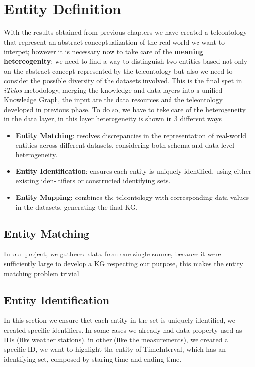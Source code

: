 \section{Entity Definition}

With the results obtained from previous chapters we have created a teleontology that represent an abstract conceptualization of the real world we want to interpet; however it is necessary now to take care of the \textbf{meaning hetereogenity}: we need to find a way to distinguish two entities based not only on the abstract conecpt represented by the teleontology but also we need to consider the possible diversity of the datasets involved. This is the final spet in \textit{iTelos} metodology, merging the knowledge and data layers into a unified Knowledge Graph,
the input are the data resources and the teleontology developed in previous phase.
To do so, we have to teke care of the heterogeneity in the data layer, in this layer heterogeneity is shown in 3 different
ways
\begin{itemize}
    \item \textbf{Entity Matching}: resolves discrepancies in the representation of real-world entities across
different datasets, considering both schema and data-level heterogeneity.
    \item \textbf{Entity Identification}: ensures each entity is uniquely identified, using either existing iden-
tifiers or constructed identifying sets.
    \item \textbf{Entity Mapping}: combines the teleontology with corresponding data values in the
datasets, generating the final KG.
\end{itemize}

\subsection{Entity Matching}
In our project, we gathered data from one single source, because it were sufficiently large to develop a KG respecting 
our purpose, this makes the entity matching problem trivial

\subsection{Entity Identification}
In this section we ensure thet each entity in the set is uniquely identified, we created specific identifiers.
In some cases we already had data property used as IDs (like weather stations), in other (like the measurements), we
created a specific ID, we want to highlight the entity of TimeInterval, which has an identifying set, composed by
staring time and ending time.

